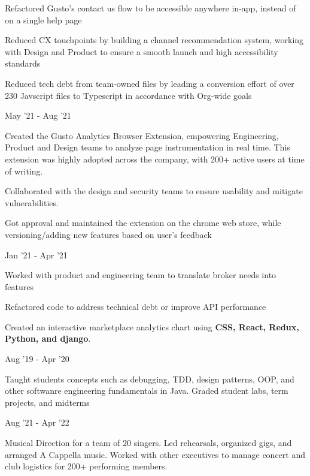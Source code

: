\documentclass[]{deedy-resume-openfont}
\begin{document}
\begin{minipage}[t]{0.95\textwidth}
\begin{tightemize}
\item Refactored Gusto's contact us flow to be accessible anywhere in-app, instead of on a single help page
\item Reduced CX touchpoints by building a channel recommendation system, working with Design and Product to ensure a smooth launch and high accessibility standards
\item Reduced tech debt from team-owned files by leading a conversion effort of over 230 Javscript files to Typescript in accordance with Org-wide goals
\end{tightemize}
\vspace{\topsep} %
\subtitle{Intern, Growth Foundation}{May '21 - Aug '21}
\begin{tightemize}
\item Created the Gusto Analytics Browser Extension, empowering Engineering, Product and Design teams to analyze page instrumentation in real time. This extension was highly adopted across the company, with 200+ active users at time of writing.
\item Collaborated with the design and security teams to ensure usability and mitigate vulnerabilities. 
\item Got approval and maintained the extension on the chrome web store, while versioning/adding new features based on user's feedback
\end{tightemize}


\subtitle{Full Stack Intern}{Jan '21 - Apr '21}
\begin{tightemize}
\item Worked with product and engineering team to translate broker needs into features
\item Refactored code to address technical debt or improve API performance
\item Created an interactive marketplace analytics chart using {\bf CSS, React, Redux, Python, and django}.
\end{tightemize}
\sectionsep


\subtitle{CS 210 Software Construction - TA}{Aug '19 - Apr '20}
\begin{tightemize}
\item Taught students concepts such as debugging, TDD, design patterns, OOP, and other softwanre engineering fundamentals in Java. Graded student labs, term projects, and midterms
\end{tightemize}
\subtitle{Co-Director, UBC A Cappella}{Aug '21 - Apr '22}
\begin{tightemize}
\item Musical Direction for a team of 20 singers. Led rehearsals, organized gigs, and arranged A Cappella music. Worked with other executives to manage concert and club logistics for 200+ performing members.
\end{tightemize}


\end{minipage}
\end{document}
